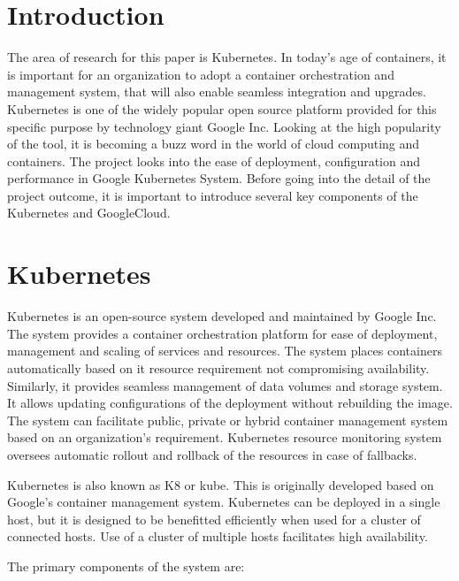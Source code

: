 \maketitle

\section{Introduction}

The area of research for this paper is Kubernetes. In today's age of
containers, it is important for an organization to adopt a container
orchestration and management system, that will also enable seamless
integration and upgrades. Kubernetes is one of the widely popular open source
platform provided for this specific purpose by technology giant Google Inc.
Looking at the high popularity of the tool, it is becoming a buzz word in the
world of cloud computing and containers. The project looks into the ease of
deployment, configuration and performance in Google Kubernetes System. Before
going into the detail of the project outcome, it is important to introduce
several key components of the Kubernetes and GoogleCloud.

\section{Kubernetes}

Kubernetes is an open-source system developed and maintained by Google Inc.
The system provides a container orchestration platform for ease of deployment,
management and scaling of services and resources. The system places containers
automatically based on it resource requirement not compromising availability.
Similarly, it provides seamless management of data volumes and storage system.
It allows updating configurations of the deployment without rebuilding the
image. The system can facilitate public, private or hybrid container
management system based on an organization's requirement.  Kubernetes resource
monitoring system oversees automatic rollout and rollback of the resources in
case of fallbacks.


Kubernetes is also known as K8 or kube. This is originally developed based on
Google's container management system. Kubernetes can be deployed in a single
host, but it is designed to be benefitted efficiently when used for a cluster
of connected hosts. Use of a cluster of multiple hosts facilitates high
availability.

The primary components of the system are: 


